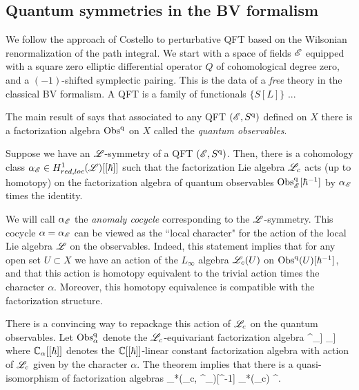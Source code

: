 \subsection{Quantum symmetries in the BV formalism}

We follow the approach of Costello \cite{CosBook} to perturbative QFT based on the Wilsonian renormalization of the path integral.
We start with a space of fields $\mathscr E$ equipped with a square zero elliptic differential operator $Q$ of cohomological degree zero, and a $(-1)$-shifted symplectic pairing.
This is the data of a {\em free} theory in the classical BV formalism.
A QFT is a family of functionals $\{S[L]\}$ ...

The main result of \cite{CG2} says that associated to any QFT $(\mathscr E, S^{\rm q})$ defined on $X$ there is a factorization algebra ${\rm Obs}^{\rm q}$ on $X$ called the {\em quantum observables}. 

\begin{thm}
Suppose we have an $\mathscr L$-symmetry of a QFT $(\mathscr E, S^{\rm q})$. 
Then, there is a cohomology class $\alpha_\mathscr E \in H^1_{red,loc}(\mathscr L)[[\hbar]]$ such that the factorization Lie algebra $\mathscr L_c$ acts (up to homotopy) on the factorization algebra of quantum observables ${\rm Obs}_{\mathscr E}^{\rm q}[\hbar^{-1}]$ by $\alpha_\mathscr E$ times the identity.
\end{thm}

We will call $\alpha_{\mathscr E}$ the {\em anomaly cocycle} corresponding to the $\mathscr L$-symmetry.
This cocycle $\alpha = \alpha_{\mathscr E}$ can be viewed as the ``local character" for the action of the local Lie algebra $\mathscr L$ on the observables.
Indeed, this statement implies that for any open set $U \subset X$ we have an action of the $L_\infty$ algebra $\mathscr L_c(U)$ on ${\rm Obs}^{\rm q}(U)[\hbar^{-1}]$, and that this action is homotopy equivalent to the trivial action times the character $\alpha$. 
Moreover, this homotopy equivalence is compatible with the factorization structure. 

There is a convincing way to repackage this action of $\mathscr L_c$ on the quantum observables. 
Let ${\rm Obs}^{\rm q}_{\alpha}$ denote the $\mathscr L_c$-equivariant factorization algebra
\ben
\Obs^\q \tensor_{\CC[[\hbar]]} {\ul \CC}_\alpha [[\hbar]]
\een
where $\mathbb C_\alpha[[\hbar]]$ denotes the $\mathbb C[[\hbar]]$-linear constant factorization algebra with action of $\mathscr L_c$ given by the character $\alpha$. 
The theorem implies that there is a quasi-isomorphism of factorization algebras
\ben
\clieu_*(\sL_c, \Obs^\q_\alpha)[\hbar^{-1}] \simeq \clieu_*(\sL_c) \tensor \Obs^\q[\hbar^{-1}] .
\een

